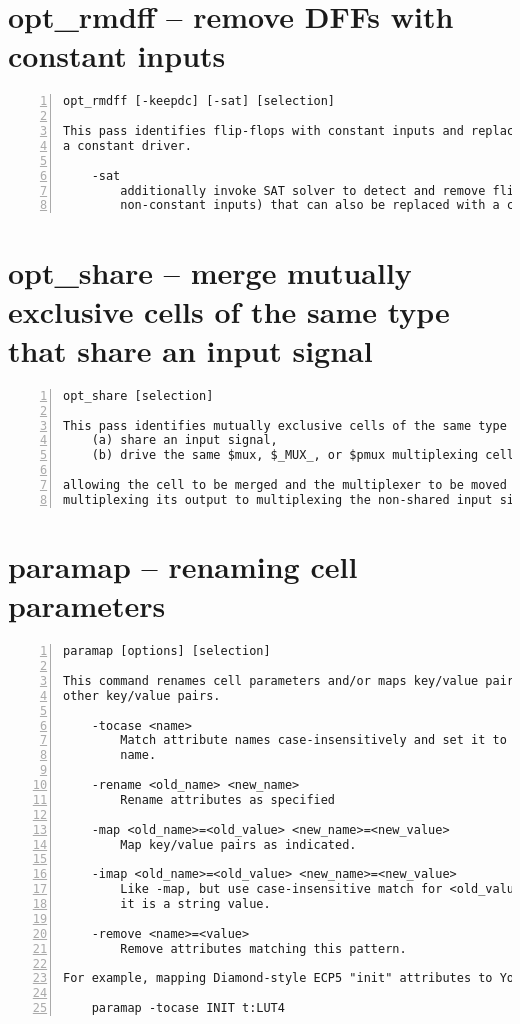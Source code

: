 \section{opt\_rmdff -- remove DFFs with constant inputs}
\label{cmd:opt_rmdff}
\begin{lstlisting}[numbers=left,frame=single]
    opt_rmdff [-keepdc] [-sat] [selection]

This pass identifies flip-flops with constant inputs and replaces them with
a constant driver.

    -sat
        additionally invoke SAT solver to detect and remove flip-flops (with 
        non-constant inputs) that can also be replaced with a constant driver
\end{lstlisting}

\section{opt\_share -- merge mutually exclusive cells of the same type that share an input signal}
\label{cmd:opt_share}
\begin{lstlisting}[numbers=left,frame=single]
    opt_share [selection]

This pass identifies mutually exclusive cells of the same type that:
    (a) share an input signal,
    (b) drive the same $mux, $_MUX_, or $pmux multiplexing cell,

allowing the cell to be merged and the multiplexer to be moved from
multiplexing its output to multiplexing the non-shared input signals.
\end{lstlisting}

\section{paramap -- renaming cell parameters}
\label{cmd:paramap}
\begin{lstlisting}[numbers=left,frame=single]
    paramap [options] [selection]

This command renames cell parameters and/or maps key/value pairs to
other key/value pairs.

    -tocase <name>
        Match attribute names case-insensitively and set it to the specified
        name.

    -rename <old_name> <new_name>
        Rename attributes as specified

    -map <old_name>=<old_value> <new_name>=<new_value>
        Map key/value pairs as indicated.

    -imap <old_name>=<old_value> <new_name>=<new_value>
        Like -map, but use case-insensitive match for <old_value> when
        it is a string value.

    -remove <name>=<value>
        Remove attributes matching this pattern.

For example, mapping Diamond-style ECP5 "init" attributes to Yosys-style:

    paramap -tocase INIT t:LUT4
\end{lstlisting}

